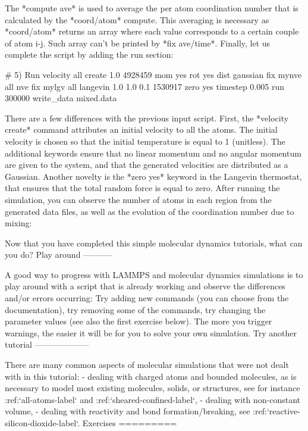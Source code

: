 The *compute ave* is used to average the per atom
coordination number that is calculated by the *coord/atom* compute.
This averaging is necessary as *coord/atom* returns an array where each value corresponds 
to a certain couple of atom i-j. Such array can't be printed by *fix ave/time*. 
Finally, let us complete the script by adding the run section:

\begin{lcverbatim}
# 5) Run
velocity all create 1.0 4928459 mom yes rot yes dist gaussian
fix mynve all nve
fix mylgv all langevin 1.0 1.0 0.1 1530917 zero yes
timestep 0.005
run 300000
write_data mixed.data
\end{lcverbatim}

There are a few differences with the
previous input script. First, the *velocity create*
command attributes an initial velocity to all the atoms.
The initial velocity is chosen so that the initial
temperature is equal to 1 (unitless). The additional
keywords ensure that no linear momentum and no angular
momentum are given to the system, and that the generated
velocities are distributed as a Gaussian. Another novelty
is the *zero yes* keyword in the Langevin thermostat, that
ensures that the total random force is equal to zero.
After running the simulation, you can observe the number
of atoms in each region from the generated data files, as
well as the evolution of the coordination number due to
mixing:



Now that you have completed this simple molecular dynamics tutorials, what can you do?
Play around
-----------

A good way to progress with LAMMPS and molecular dynamics
simulations is to play around with a script that is already
working and observe the differences and/or errors occurring:
Try adding new commands (you can choose from the documentation),
try removing some of the commands, try changing the parameter values
(see also the first exercise below).
The more you trigger warnings, the easier it will be for you to solve your
own simulation.
Try another tutorial
--------------------

There are many common aspects of molecular simulations that were not dealt with in this
tutorial:
- dealing with charged atoms and bounded molecules, as is necessary to model most existing molecules, solids, or structures, see for instance :ref:`all-atoms-label` and :ref:`sheared-confined-label`,
- dealing with non-constant volume,
- dealing with reactivity and bond formation/breaking, see :ref:`reactive-silicon-dioxide-label`.
Exercises
=========

